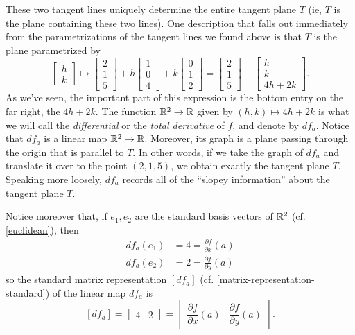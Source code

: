 These two tangent lines uniquely determine the entire tangent plane $T$ (ie, $T$ is the plane containing these two lines). One description that falls out immediately from the parametrizations of the tangent lines we found above is that $T$ is the plane parametrized by
\[ \begin{bmatrix} h \\ k \end{bmatrix} \mapsto \begin{bmatrix} 2 \\ 1 \\ 5 \end{bmatrix} + h \begin{bmatrix} 1 \\ 0 \\ 4 \end{bmatrix} + k \begin{bmatrix} 0 \\ 1 \\ 2 \end{bmatrix} = \begin{bmatrix} 2 \\ 1 \\ 5 \end{bmatrix} + \begin{bmatrix} h \\ k \\ 4h + 2k \end{bmatrix}. \]
As we've seen, the important part of this expression is the bottom entry on the far right, the $4h + 2k$. The function $\mathbb{R}^2 \to \mathbb{R}$ given by $(h, k)  \mapsto 4h + 2k$ is what we will call the \emph{differential} or the \emph{total derivative} of $f$, and denote by $df_a$. Notice that $df_a$ is a linear map $\mathbb{R}^2 \to \mathbb{R}$. Moreover, its graph is a plane passing through the origin that is parallel to $T$. In other words, if we take the graph of $df_a$ and translate it over to the point $(2,1,5)$, we obtain exactly the tangent plane $T$. Speaking more loosely, $df_a$ records all of the ``slopey information'' about the tangent plane $T$. 

Notice moreover that, if $e_1, e_2$ are the standard basis vectors of $\mathbb{R}^2$ (cf. \cref{euclidean}), then
\[ \begin{aligned} df_a(e_1) &= 4 = \frac{\partial f}{\partial x}(a) \\
df_a(e_2) &= 2 = \frac{\partial f}{\partial y}(a) \end{aligned} \]
so the standard matrix representation $[df_a]$ (cf. \cref{matrix-representation-standard}) of the linear map $df_a$ is \begin{equation} \label{jacobian-matrix-example} [df_a] = \begin{bmatrix} 4 & 2 \end{bmatrix} = \begin{bmatrix} \dfrac{\partial f}{\partial x}(a) & \dfrac{\partial f}{\partial y}(a) \end{bmatrix}. \end{equation}

